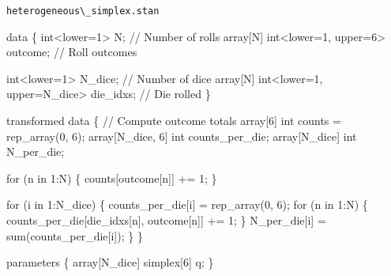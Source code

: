 \documentclass[
  letterpaper,
  DIV=11,
  numbers=noendperiod]{scrartcl}
\newenvironment{Shaded}{\begin{snugshade}}{\end{snugshade}}
\newcommand{\CommentTok}[1]{\textcolor[rgb]{0.37,0.37,0.37}{#1}}
\newcommand{\ControlFlowTok}[1]{\textcolor[rgb]{0.00,0.23,0.31}{#1}}
\newcommand{\DataTypeTok}[1]{\textcolor[rgb]{0.68,0.00,0.00}{#1}}
\newcommand{\DecValTok}[1]{\textcolor[rgb]{0.68,0.00,0.00}{#1}}
\newcommand{\KeywordTok}[1]{\textcolor[rgb]{0.00,0.23,0.31}{#1}}
\newcommand{\NormalTok}[1]{\textcolor[rgb]{0.00,0.23,0.31}{#1}}
\begin{document}
\begin{codelisting}

\caption{\texttt{heterogeneous\textbackslash\_simplex.stan}}

\begin{Shaded}
\begin{Highlighting}[]
\KeywordTok{data}\NormalTok{ \{}
  \DataTypeTok{int}\NormalTok{\textless{}}\KeywordTok{lower}\NormalTok{=}\DecValTok{1}\NormalTok{\textgreater{} N;                         }\CommentTok{// Number of rolls}
  \DataTypeTok{array}\NormalTok{[N] }\DataTypeTok{int}\NormalTok{\textless{}}\KeywordTok{lower}\NormalTok{=}\DecValTok{1}\NormalTok{, }\KeywordTok{upper}\NormalTok{=}\DecValTok{6}\NormalTok{\textgreater{} outcome; }\CommentTok{// Roll outcomes}

  \DataTypeTok{int}\NormalTok{\textless{}}\KeywordTok{lower}\NormalTok{=}\DecValTok{1}\NormalTok{\textgreater{} N\_dice;                          }\CommentTok{// Number of dice}
  \DataTypeTok{array}\NormalTok{[N] }\DataTypeTok{int}\NormalTok{\textless{}}\KeywordTok{lower}\NormalTok{=}\DecValTok{1}\NormalTok{, }\KeywordTok{upper}\NormalTok{=N\_dice\textgreater{} die\_idxs; }\CommentTok{// Die rolled}
\NormalTok{\}}

\KeywordTok{transformed data}\NormalTok{ \{}
  \CommentTok{// Compute outcome totals}
  \DataTypeTok{array}\NormalTok{[}\DecValTok{6}\NormalTok{] }\DataTypeTok{int}\NormalTok{ counts = rep\_array(}\DecValTok{0}\NormalTok{, }\DecValTok{6}\NormalTok{);}
  \DataTypeTok{array}\NormalTok{[N\_dice, }\DecValTok{6}\NormalTok{] }\DataTypeTok{int}\NormalTok{ counts\_per\_die;}
  \DataTypeTok{array}\NormalTok{[N\_dice] }\DataTypeTok{int}\NormalTok{ N\_per\_die;}
  
  \ControlFlowTok{for}\NormalTok{ (n }\ControlFlowTok{in} \DecValTok{1}\NormalTok{:N) \{}
\NormalTok{    counts[outcome[n]] += }\DecValTok{1}\NormalTok{;}
\NormalTok{  \}}

  \ControlFlowTok{for}\NormalTok{ (i }\ControlFlowTok{in} \DecValTok{1}\NormalTok{:N\_dice) \{}
\NormalTok{    counts\_per\_die[i] = rep\_array(}\DecValTok{0}\NormalTok{, }\DecValTok{6}\NormalTok{);}
    \ControlFlowTok{for}\NormalTok{ (n }\ControlFlowTok{in} \DecValTok{1}\NormalTok{:N) \{}
\NormalTok{      counts\_per\_die[die\_idxs[n], outcome[n]] += }\DecValTok{1}\NormalTok{;}
\NormalTok{    \}}
\NormalTok{    N\_per\_die[i] = sum(counts\_per\_die[i]);}
\NormalTok{  \}}
\NormalTok{\}}

\KeywordTok{parameters}\NormalTok{ \{}
  \DataTypeTok{array}\NormalTok{[N\_dice] }\DataTypeTok{simplex}\NormalTok{[}\DecValTok{6}\NormalTok{] q;}
\NormalTok{\}}


\end{Highlighting}
\end{Shaded}
\end{codelisting}
\end{document}

